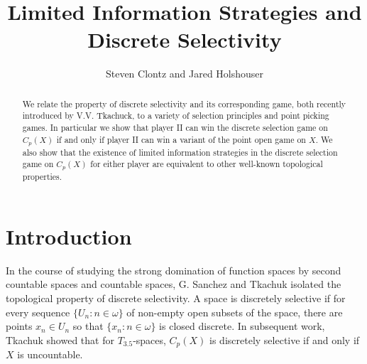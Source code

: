 \documentclass{amsart}
\theoremstyle{plain}
\theoremstyle{definition}
\theoremstyle{remark}
\theoremstyle{plain}
\theoremstyle{definition}
\theoremstyle{remark}
\begin{document}
\title{Limited Information Strategies and Discrete Selectivity}
\author{Steven Clontz and Jared Holshouser}
\address{Department of Mathematics and Statistics,
The University of South Alabama,
Mobile, AL 36688}



\begin{abstract}
 We relate the property of discrete selectivity and its corresponding game, both recently introduced by V.V. Tkachuck, to a variety of selection principles and point picking games. In particular we show that player II can win the discrete selection game on \(C_p(X)\) if and only if player II can win a variant of the point open game on \(X\). We also show that the existence of limited information strategies in the discrete selection game on \(C_p(X)\) for either player are equivalent to other well-known topological properties.
\end{abstract}

\maketitle

\renewcommand{\rothGame}[1]{\ensuremath{G_1(\mc O_{#1},\mc O_{#1})}}

\section{Introduction}

In the course of studying the strong domination of function spaces by second countable spaces and countable spaces, G. Sanchez and Tkachuk isolated the topological property of discrete selectivity\cite{SanchezTkachuk}\cite{Tkachuk1}.
A space is discretely selective if for every sequence \(\{U_n : n \in \omega\}\) of non-empty open subsets of the space, there are points \(x_n \in U_n\) so that \(\{x_n : n \in \omega\}\) is closed discrete.
In subsequent work, Tkachuk showed that for \(T_{3.5}\)-spaces, \(C_p(X)\) is discretely selective if and only if \(X\) is uncountable.
\end{document}
